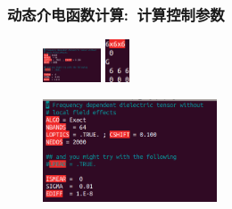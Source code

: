 \frame
{
	\frametitle{动态介电函数计算:~计算控制参数}
	{\fontsize{7.5pt}{5.2pt}}%
\begin{figure}[h!] 
\centering
\includegraphics[height=0.4in,viewport=0 10 170 90,clip]{Figures/SiC-optic-INCAR.png}
\includegraphics[height=0.5in,viewport=0 0 100 106,clip]{Figures/SiC-optic-KPOINTS.png}
\caption{\fontsize{6.2pt}{5.2pt}}%
\label{SiC-optic-Input}
\end{figure}
	\vskip -8pt
{\fontsize{7.5pt}{5.2pt}}%
\begin{figure}[h!]
\centering
\includegraphics[height=1.2in,viewport=0 10 500 300,clip]{Figures/SiC-optic-INCAR.png}
\caption{\fontsize{6.2pt}{5.2pt}}%
\label{SiC-optic-INCAR}
\end{figure}
}

